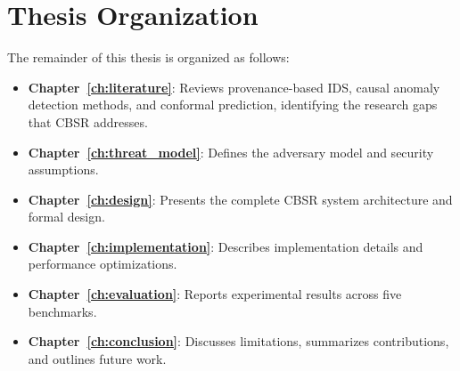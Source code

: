 \section{Thesis Organization}

The remainder of this thesis is organized as follows:
\begin{itemize}
\item \textbf{Chapter~\ref{ch:literature}}: Reviews provenance-based IDS, causal anomaly
    detection methods, and conformal prediction, identifying the research gaps that CBSR
    addresses.
\item \textbf{Chapter~\ref{ch:threat_model}}: Defines the adversary model and security
    assumptions.
\item \textbf{Chapter~\ref{ch:design}}: Presents the complete CBSR system architecture and
    formal design.
\item \textbf{Chapter~\ref{ch:implementation}}: Describes implementation details and
    performance optimizations.
\item \textbf{Chapter~\ref{ch:evaluation}}: Reports experimental results across five benchmarks.
\item \textbf{Chapter~\ref{ch:conclusion}}: Discusses limitations, summarizes contributions,
    and outlines future work.
\end{itemize}
